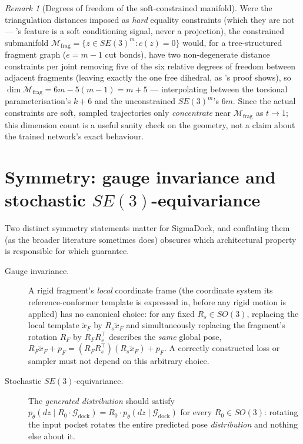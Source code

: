 \documentclass[11pt,a4paper]{report}
\theoremstyle{definition}
\theoremstyle{remark}
\newtheorem{remark}[remark]{Remark}
\begin{document}
\begin{remark}[Degrees of freedom of the soft-constrained manifold]
\label{rem:soft-constraint-dof}
Were the triangulation distances imposed as \emph{hard} equality
constraints (which they are not --- 's
feature is a soft conditioning signal, never a projection), the
constrained submanifold $\mathcal M_{\mathrm{frag}}=\{z\in SE(3)^m:c(z)=0\}$
would, for a tree-structured fragment graph ($e=m-1$ cut bonds), have two
non-degenerate distance constraints per joint removing five of the six
relative degrees of freedom between adjacent fragments (leaving exactly the
one free dihedral, as 's proof shows), so
$\dim\mathcal M_{\mathrm{frag}} = 6m-5(m-1) = m+5$ --- interpolating between
the torsional parameterisation's $k+6$ and the unconstrained $SE(3)^m$'s
$6m$. Since the actual constraints are soft, sampled trajectories only
\emph{concentrate} near $\mathcal M_{\mathrm{frag}}$ as $t\to1$; this
dimension count is a useful sanity check on the geometry, not a claim
about the trained network's exact behaviour.
\end{remark}

\section{Symmetry: gauge invariance and stochastic $SE(3)$-equivariance}
\label{sec:sigmadock-symmetry-precise}

Two distinct symmetry statements matter for SigmaDock, and conflating them
(as the broader literature sometimes does) obscures which architectural
property is responsible for which guarantee.

\begin{description}
\item[Gauge invariance.] A rigid fragment's \emph{local} coordinate frame
(the coordinate system its reference-conformer template is expressed in,
before any rigid motion is applied) has no canonical choice: for any fixed
$R_s\in SO(3)$, replacing the local template $\tilde x_F$ by
$R_s\tilde x_F$ and simultaneously replacing the fragment's rotation $R_F$
by $R_FR_s^\top$ describes the \emph{same} global pose,
$R_F\tilde x_F+p_F = (R_FR_s^\top)(R_s\tilde x_F)+p_F$. A correctly
constructed loss or sampler must not depend on this arbitrary choice.
\item[Stochastic $SE(3)$-equivariance.] The \emph{generated distribution}
should satisfy $p_\theta(dz\mid R_0\cdot\mathcal G_{\mathrm{dock}}) = R_0\cdot p_\theta(dz\mid\mathcal G_{\mathrm{dock}})$
for every $R_0\in SO(3)$: rotating the input pocket rotates the entire
predicted pose \emph{distribution} and nothing else about it.
\end{description}
\end{document}
